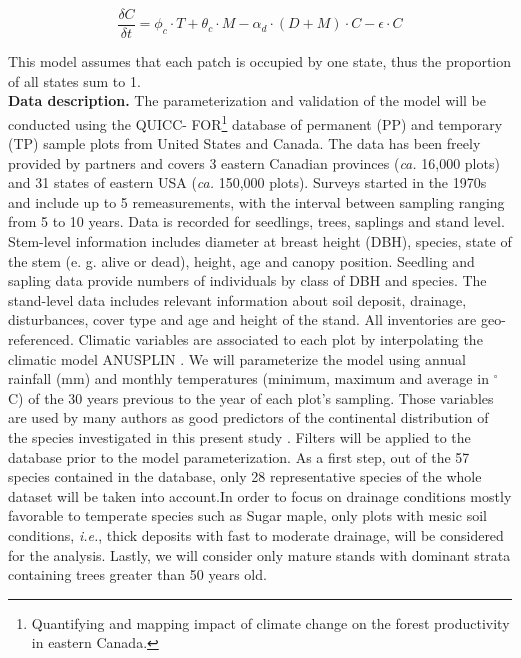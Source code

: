 \begin{equation}
	\frac{\delta C}{\delta t} = \phi_c \cdot T + \theta_c \cdot M -\alpha_d \cdot (D+M)\cdot C - \epsilon \cdot C
\end{equation}

This model assumes that each patch is occupied by
one state, thus the proportion of all states sum to 1.\\

\textbf{Data description.} The parameterization and validation of the model
will be conducted using the QUICC- FOR\footnote{Quantifying and mapping impact
of climate change on the forest productivity in eastern Canada.} database of
permanent (PP) and temporary (TP) sample plots from United States and Canada.
The data has been freely provided by partners and covers 3 eastern Canadian
provinces (\textit{ca.} 16,000 plots) and 31 states of eastern USA
(\textit{ca.} 150,000 plots). Surveys started in the 1970s and include up to 5
remeasurements, with the interval between sampling ranging from 5 to 10 years.
Data is recorded for seedlings, trees, saplings and stand level. Stem-level
information includes diameter at breast height (DBH), species, state of the
stem (e. g. alive or dead), height, age and canopy position. Seedling and
sapling data provide numbers of individuals by class of DBH and species. The
stand-level data includes relevant information about soil deposit, drainage,
disturbances, cover type and age and height of the stand. All  inventories are
geo-referenced. Climatic variables are associated to each plot by
interpolating  the climatic model ANUSPLIN \cite{McKenney2011} . We will
parameterize the model using annual rainfall (mm) and monthly temperatures
(minimum, maximum and average in \ensuremath{^\circ}C) of the 30 years
previous to the year of each plot's sampling. Those variables are used by many
authors as good predictors of the continental distribution of the species
investigated in this present study \cite{Goldblum2010}. Filters will be
applied to the database prior to the model parameterization. As a first step,
out of the 57 species contained in the database, only 28 representative
species of the whole dataset will be taken into account.In order to focus on
drainage conditions mostly favorable to temperate species such as  Sugar
maple, only plots with mesic soil conditions, \textit{i.e.}, thick deposits
with fast to moderate drainage, will be considered for the analysis. Lastly,
we will consider only mature stands with dominant strata containing trees
greater than 50 years old. \\

